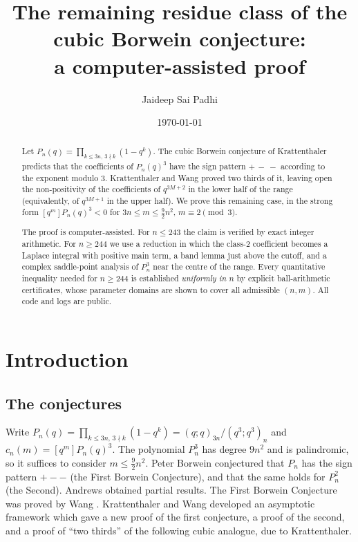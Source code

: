 \documentclass[11pt,reqno]{amsart}
\theoremstyle{plain}
\theoremstyle{definition}
\begin{document}
\title[The remaining class of the cubic Borwein conjecture]
{The remaining residue class of the cubic Borwein conjecture: \\ a computer-assisted proof}

\author{Jaideep Sai Padhi}
\address{Purdue University, West Lafayette, IN 47907, USA}
\date{\today}

\begin{abstract}
Let $P_n(q)=\prod_{k\le 3n,\,3\nmid k}(1-q^k)$. The cubic Borwein conjecture of Krattenthaler predicts that the coefficients of
$P_n(q)^3$ have the sign pattern $+\,-\,-$ according to the exponent modulo $3$. Krattenthaler and Wang proved two thirds of it,
leaving open the non-positivity of the coefficients of $q^{3M+2}$ in the lower half of the range (equivalently, of $q^{3M+1}$ in the
upper half). We prove this remaining case, in the strong form $[q^m]P_n(q)^3<0$ for $3n\le m\le\frac92n^2$, $m\equiv2\pmod 3$.

The proof is computer-assisted. For $n\le243$ the claim is verified by exact integer arithmetic. For $n\ge244$ we use a
reduction in which the class-$2$ coefficient becomes a Laplace integral with positive main term, a band lemma just above the
cutoff, and a complex saddle-point analysis of $P_n^3$ near the centre of the range. Every quantitative inequality needed for
$n\ge244$ is established \emph{uniformly in $n$} by explicit ball-arithmetic certificates, whose parameter domains are shown to
cover all admissible $(n,m)$. All code and logs are public.
\end{abstract}

\maketitle

\section{Introduction}

\subsection{The conjectures}
Write $P_n(q)=\prod_{k\le 3n,\,3\nmid k}(1-q^k)=(q;q)_{3n}/(q^3;q^3)_n$ and $c_n(m)=[q^m]P_n(q)^3$. The polynomial $P_n^3$ has
degree $9n^2$ and is palindromic, so it suffices to consider $m\le\frac92n^2$. Peter Borwein conjectured that $P_n$ has the sign
pattern $+--$ (the First Borwein Conjecture), and that the same holds for $P_n^2$ (the Second). Andrews \cite{Andrews1995} obtained
partial results. The First Borwein Conjecture was proved by Wang \cite{Wang2022}. Krattenthaler and Wang \cite{KW} developed an
asymptotic framework which gave a new proof of the first conjecture, a proof of the second, and a proof of ``two thirds'' of the
following cubic analogue, due to Krattenthaler.
\end{document}
